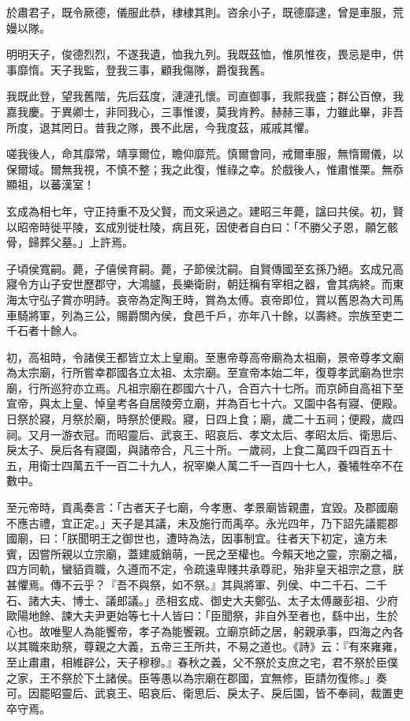 \begin{pinyinscope}
於肅君子，既令厥德，儀服此恭，棣棣其則。咨余小子，既德靡逮，曾是車服，荒嫚以隊。

明明天子，俊德烈烈，不遂我遺，恤我九列。我既茲恤，惟夙惟夜，畏忌是申，供事靡惰。天子我監，登我三事，顧我傷隊，爵復我舊。

我既此登，望我舊階，先后茲度，漣漣孔懷。司直御事，我熙我盛；群公百僚，我嘉我慶。于異卿士，非同我心，三事惟谡，莫我肯矜。赫赫三事，力雖此畢，非吾所度，退其罔日。昔我之隊，畏不此居，今我度茲，戚戚其懼。

嗟我後人，命其靡常，靖享爾位，瞻仰靡荒。慎爾會同，戒爾車服，無惰爾儀，以保爾域。爾無我視，不慎不整；我之此復，惟祿之幸。於戲後人，惟肅惟栗。無忝顯祖，以蕃漢室！

玄成為相七年，守正持重不及父賢，而文采過之。建昭三年薨，諡曰共侯。初，賢以昭帝時徙平陵，玄成別徙杜陵，病且死，因使者自白曰：「不勝父子恩，願乞骸骨，歸葬父墓。」上許焉。

子頃侯寬嗣。薨，子僖侯育嗣。薨，子節侯沈嗣。自賢傳國至玄孫乃絕。玄成兄高寢令方山子安世歷郡守，大鴻臚，長樂衛尉，朝廷稱有宰相之器，會其病終。而東海太守弘子賞亦明詩。哀帝為定陶王時，賞為太傅。哀帝即位，賞以舊恩為大司馬車騎將軍，列為三公，賜爵關內侯，食邑千戶，亦年八十餘，以壽終。宗族至吏二千石者十餘人。

初，高祖時，令諸侯王都皆立太上皇廟。至惠帝尊高帝廟為太祖廟，景帝尊孝文廟為太宗廟，行所嘗幸郡國各立太祖、太宗廟。至宣帝本始二年，復尊孝武廟為世宗廟，行所巡狩亦立焉。凡祖宗廟在郡國六十八，合百六十七所。而京師自高祖下至宣帝，與太上皇、悼皇考各自居陵旁立廟，并為百七十六。又園中各有寢、便殿。日祭於寢，月祭於廟，時祭於便殿。寢，日四上食；廟，歲二十五祠；便殿，歲四祠。又月一游衣冠。而昭靈后、武哀王、昭哀后、孝文太后、孝昭太后、衛思后、戾太子、戾后各有寢園，與諸帝合，凡三十所。一歲祠，上食二萬四千四百五十五，用衛士四萬五千一百二十九人，祝宰樂人萬二千一百四十七人，養犧牲卒不在數中。

至元帝時，貢禹奏言：「古者天子七廟，今孝惠、孝景廟皆親盡，宜毀。及郡國廟不應古禮，宜正定。」天子是其議，未及施行而禹卒。永光四年，乃下詔先議罷郡國廟，曰：「朕聞明王之御世也，遭時為法，因事制宜。往者天下初定，遠方未賓，因嘗所親以立宗廟，蓋建威銷萌，一民之至權也。今賴天地之靈，宗廟之福，四方同軌，蠻貊貢職，久遵而不定，令疏遠卑賤共承尊祀，殆非皇天祖宗之意，朕甚懼焉。傳不云乎？『吾不與祭，如不祭。』其與將軍、列侯、中二千石、二千石、諸大夫、博士、議郎議。」丞相玄成、御史大夫鄭弘、太子太傅嚴彭祖、少府歐陽地餘、諫大夫尹更始等七十人皆曰：「臣聞祭，非自外至者也，繇中出，生於心也。故唯聖人為能饗帝，孝子為能饗親。立廟京師之居，躬親承事，四海之內各以其職來助祭，尊親之大義，五帝三王所共，不易之道也。《詩》云：『有來雍雍，至止肅肅，相維辟公，天子穆穆。』春秋之義，父不祭於支庶之宅，君不祭於臣僕之家，王不祭於下土諸侯。臣等愚以為宗廟在郡國，宜無修，臣請勿復修。」奏可。因罷昭靈后、武哀王、昭哀后、衛思后、戾太子、戾后園，皆不奉祠，裁置吏卒守焉。


\end{pinyinscope}
